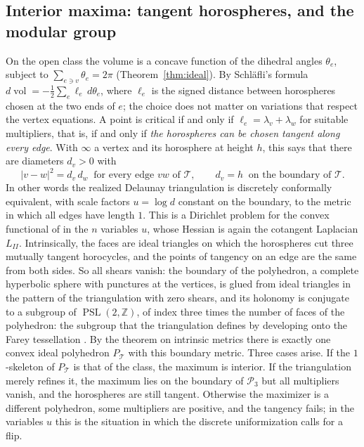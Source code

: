 \documentclass[11pt]{amsart}
\theoremstyle{definition}
\theoremstyle{remark}
\newcommand{\cT}{\mathcal{T}}
\begin{document}
\subsection{Interior maxima: tangent horospheres, and the modular group}
On the open class the volume is a concave function of the dihedral angles $\theta_e$, subject to $\sum_{e\ni v}\theta_e=2\pi$ (Theorem~\ref{thm:ideal}). By Schl\"afli's formula $d\operatorname{vol}=-\frac12\sum_e\ell_e\,d\theta_e$, where $\ell_e$ is the signed distance between horospheres chosen at the two ends of $e$; the choice does not matter on variations that respect the vertex equations.
A point is critical if and only if $\ell_e=\lambda_v+\lambda_w$ for suitable multipliers, that is, if and only if \emph{the horospheres can be chosen tangent along every edge}.
With $\infty$ a vertex and its horosphere at height $h$, this says that there are diameters $d_v>0$ with
\[
|v-w|^2=d_v\,d_w\ \text{ for every edge $vw$ of $\cT$},\qquad d_v=h\ \text{ on the boundary of $\cT$.}
\]
In other words the realized Delaunay triangulation is discretely conformally equivalent, with scale factors $u=\log d$ constant on the boundary, to the metric in which all edges have length $1$. This is a Dirichlet problem for the convex functional of \cite{BPS15,Spr20} in the $n$ variables $u$, whose Hessian is again the cotangent Laplacian $L_{II}$.
Intrinsically, the faces are ideal triangles on which the horospheres cut three mutually tangent horocycles, and the points of tangency on an edge are the same from both sides. So all shears vanish: the boundary of the polyhedron, a complete hyperbolic sphere with punctures at the vertices, is glued from ideal triangles in the pattern of the triangulation with zero shears,
and its holonomy is conjugate to a subgroup of $\operatorname{PSL}(2,\mathbb Z)$, of index three times the number of faces of the polyhedron: the subgroup that the triangulation defines by developing onto the Farey tessellation \cite{Pen87}.
By the theorem on intrinsic metrics \cite{Riv94b} there is exactly one convex ideal polyhedron $P_\cT$ with this boundary metric. Three cases arise. If the $1$-skeleton of $P_\cT$ is that of the class, the maximum is interior. If the triangulation merely refines it, the maximum lies on the boundary of $\mathcal P_3$ but all multipliers vanish, and the horospheres are still tangent.
Otherwise the maximizer is a different polyhedron, some multipliers are positive, and the tangency fails; in the variables $u$ this is the situation in which the discrete uniformization calls for a flip.
\end{document}

